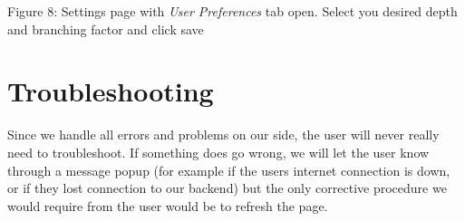 \documentclass[hidelinks,english]{article}
\begin{document}
	\begin{center}
	  \caption{Figure 8: Settings page with \textit{User Preferences} tab open. Select you desired depth and branching factor and click save}
	  \label{mobile page}
	\end{center}
	
	\section{Troubleshooting}
	Since we handle all errors and problems on our side, the user will never really need to troubleshoot. If something does go wrong, we will let the user know through a message popup (for example if the users internet connection is down, or if they lost connection to our backend) but the only corrective procedure we would require from the user would be to refresh the page. 
\end{document}
